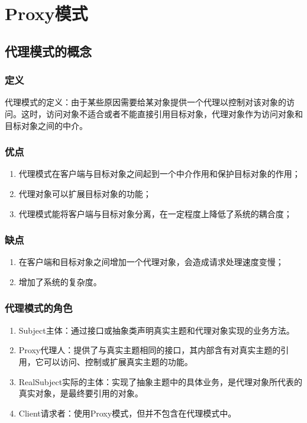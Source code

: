 \chapter{Proxy模式}
\section{代理模式的概念}
\subsection{定义}
代理模式的定义：由于某些原因需要给某对象提供一个代理以控制对该对象的访问。这时，访问对象不适合或者不能直接引用目标对象，代理对象作为访问对象和目标对象之间的中介。
\subsection{优点}
\begin{enumerate}
	\item 代理模式在客户端与目标对象之间起到一个中介作用和保护目标对象的作用；
	\item 代理对象可以扩展目标对象的功能；
	\item 代理模式能将客户端与目标对象分离，在一定程度上降低了系统的耦合度；
\end{enumerate}
\subsection{缺点}
\begin{enumerate}
	\item 在客户端和目标对象之间增加一个代理对象，会造成请求处理速度变慢；
	\item 增加了系统的复杂度。
\end{enumerate}
\subsection{代理模式的角色}
\begin{enumerate}
	\item Subject主体：通过接口或抽象类声明真实主题和代理对象实现的业务方法。
	\item Proxy代理人：提供了与真实主题相同的接口，其内部含有对真实主题的引用，它可以访问、控制或扩展真实主题的功能。
	\item RealSubject实际的主体：实现了抽象主题中的具体业务，是代理对象所代表的真实对象，是最终要引用的对象。
	\item Client请求者：使用Proxy模式，但并不包含在代理模式中。
\end{enumerate}
